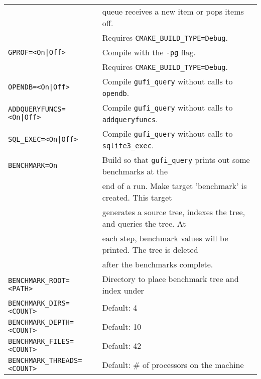 \begin{tabular} {| l | l |}
  & queue receives a new item or
  pops items off.\\
  & Requires
  \texttt{CMAKE\_BUILD\_TYPE=Debug}. \\
  \hline
  \texttt{GPROF=<On|Off>} & Compile with the \texttt{-pg} flag.\\
  & Requires
  \texttt{CMAKE\_BUILD\_TYPE=Debug}. \\
  \hline
  \texttt{OPENDB=<On|Off>} & Compile \texttt{gufi\_query} without
  calls to \texttt{opendb}.\\
  \hline
  \texttt{ADDQUERYFUNCS=<On|Off>} & Compile \texttt{gufi\_query}
  without calls to \texttt{addqueryfuncs}.\\
  \hline
  \texttt{SQL\_EXEC=<On|Off>} & Compile \texttt{gufi\_query} without
  calls to \texttt{sqlite3\_exec}. \\
  \hline
  \texttt{BENCHMARK=On} & Build so that \texttt{gufi\_query} prints out
  some benchmarks at the \\
  & end of a run. Make target 'benchmark' is
  created. This target \\
  & generates a source tree, indexes the tree, and
  queries the tree. At \\
  & each step, benchmark values will be
  printed. The tree is deleted \\
  & after the benchmarks complete.\\
  \hline
  \texttt{BENCHMARK\_ROOT=<PATH>} & Directory to place benchmark tree
  and index under\\
  \hline
  \texttt{BENCHMARK\_DIRS=<COUNT>} &  Default: 4\\
  \hline
  \texttt{BENCHMARK\_DEPTH=<COUNT>} & Default: 10\\
  \hline
  \texttt{BENCHMARK\_FILES=<COUNT>} & Default: 42\\
  \hline
  \texttt{BENCHMARK\_THREADS=<COUNT>} & Default: \# of processors on the machine\\
  \hline
\end{tabular}
